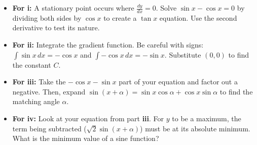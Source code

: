 \begin{hint}
\begin{itemize}
    \item \textbf{For i:} A stationary point occurs where $\frac{dy}{dx} = 0$. Solve $\sin x - \cos x = 0$ by dividing both sides by $\cos x$ to create a $\tan x$ equation. Use the second derivative to test its nature.
    \item \textbf{For ii:} Integrate the gradient function. Be careful with signs: $\int \sin x \, dx = -\cos x$ and $\int -\cos x \, dx = -\sin x$. Substitute $(0,0)$ to find the constant $C$.
    \item \textbf{For iii:} Take the $-\cos x - \sin x$ part of your equation and factor out a negative. Then, expand $\sin(x + \alpha) = \sin x \cos \alpha + \cos x \sin \alpha$ to find the matching angle $\alpha$.
    \item \textbf{For iv:} Look at your equation from part \textbf{iii}. For $y$ to be a maximum, the term being subtracted ($\sqrt{2}\sin(x + \alpha)$) must be at its absolute minimum. What is the minimum value of a sine function?
\end{itemize}
\end{hint}

